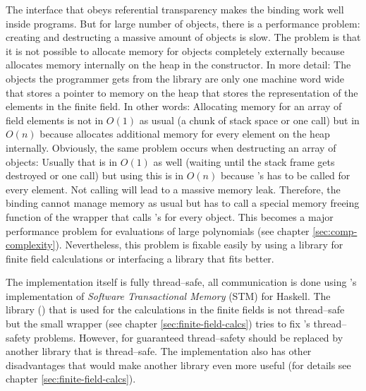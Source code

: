 The interface that obeys referential transparency makes the binding work well
inside \JWThaskell{} programs. But for large number of \JWTntl{} objects, there
is a performance problem: creating and destructing a massive amount of objects
is slow. The problem is that it is not possible to allocate memory for \JWTntl{}
objects completely externally because \JWTntl{} allocates memory internally on
the heap in the constructor. In more detail: The objects the programmer gets
from the \JWTntl{} library are only one machine word wide that stores a pointer
to memory on the heap that stores the representation of the elements in the
finite field. In other words: Allocating memory for an array of field elements
is not in $O(1)$ as usual (a chunk of stack space or one  call)
but in $O(n)$ because \JWTntl{} allocates additional memory for every element on
the heap internally. Obviously, the same problem occurs when destructing an
array of \JWTntl{} objects: Usually that is in $O(1)$ as well (waiting until the
stack frame gets destroyed or one  call) but using \JWTntl{} this
is in $O(n)$ because \JWTcpp{}'s  has to be called for every
element. Not calling  will lead to a massive memory leak.
Therefore, the \JWThaskell{} binding cannot manage memory as usual but has to
call a special memory freeing function of the \JWTc{} wrapper that calls
\JWTcpp{}'s  for every object. This becomes a major performance
problem for evaluations of large polynomials (see chapter
\ref{sec:comp-complexity}). Nevertheless, this problem is fixable easily by
using a \JWThaskell{} library for finite field calculations or interfacing a
library that fits better.



The implementation itself is fully thread--safe, all communication is done using
\JWTghc{}'s implementation of \emph{Software Transactional Memory} (STM)
\cite{stm05} for Haskell. The library (\JWTntl{}) that is used for the
calculations in the finite fields is not thread--safe but the small \JWTc{}
wrapper (see chapter \ref{sec:finite-field-calcs}) tries to fix \JWTntl{}'s
thread--safety problems. However, for guaranteed thread--safety \JWTntl{} should
be replaced by another library that is thread--safe. The \JWTntl{}
implementation also has other disadvantages that would make another library even
more useful (for details see chapter \ref{sec:finite-field-calcs}).



